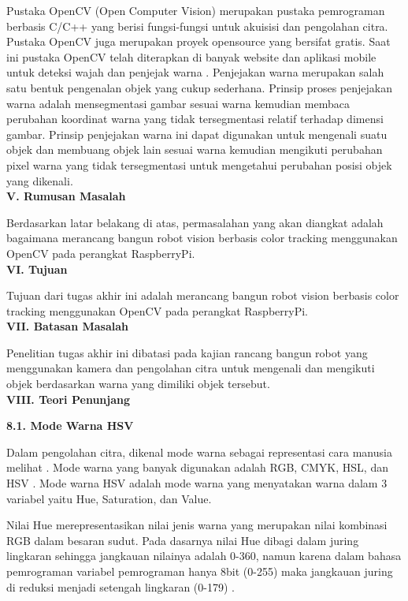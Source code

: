 \documentclass[a4paper,12pt]{article}
\begin{document}
Pustaka OpenCV (Open Computer Vision) merupakan pustaka pemrograman berbasis C/C++ yang berisi fungsi-fungsi untuk akuisisi dan pengolahan citra.
Pustaka OpenCV juga merupakan proyek opensource yang bersifat gratis.
Saat ini pustaka OpenCV telah diterapkan di banyak website dan aplikasi mobile untuk deteksi wajah dan penjejak warna \cite{opencv_intro}.
Penjejakan warna merupakan salah satu bentuk pengenalan objek yang cukup sederhana. 
Prinsip proses penjejakan warna adalah mensegmentasi gambar sesuai warna kemudian membaca perubahan koordinat warna yang tidak tersegmentasi relatif terhadap dimensi gambar.
Prinsip penjejakan warna ini dapat digunakan untuk mengenali suatu objek dan membuang objek lain sesuai warna kemudian mengikuti perubahan pixel warna yang tidak tersegmentasi untuk mengetahui perubahan posisi objek yang dikenali.
\\[10pt]
\noindent \textbf{V. \hspace{10pt} Rumusan Masalah}

Berdasarkan latar belakang di atas, permasalahan yang akan diangkat adalah bagaimana merancang bangun robot vision berbasis color tracking menggunakan OpenCV pada perangkat RaspberryPi.
\\[10pt]
\noindent \textbf{VI. \hspace{9pt} Tujuan}

Tujuan dari tugas akhir ini adalah merancang bangun robot vision berbasis color tracking menggunakan OpenCV pada perangkat RaspberryPi.
\\[10pt]
\noindent \textbf{VII. \hspace{8pt} Batasan Masalah}

Penelitian tugas akhir ini dibatasi pada kajian rancang bangun robot yang menggunakan kamera dan pengolahan citra untuk mengenali dan mengikuti objek berdasarkan warna yang dimiliki objek tersebut.
\\[10pt]
\noindent \textbf{VIII. \hspace{7pt} Teori Penunjang}

\indent \textbf{8.1. \hspace{8pt} Mode Warna HSV}

Dalam pengolahan citra, dikenal mode warna sebagai representasi cara manusia melihat \cite{robot} . 
Mode warna yang banyak digunakan adalah RGB, CMYK, HSL, dan HSV \cite{improc1}. 
Mode warna HSV adalah mode warna yang menyatakan warna dalam 3 variabel yaitu Hue, Saturation, dan Value.

Nilai Hue merepresentasikan nilai jenis warna yang merupakan nilai kombinasi RGB dalam besaran sudut. 
Pada dasarnya nilai Hue dibagi dalam juring lingkaran sehingga jangkauan nilainya adalah 0-360, namun karena dalam bahasa pemrograman variabel pemrograman hanya 8bit (0-255) maka jangkauan juring di reduksi menjadi setengah lingkaran (0-179) \cite{opencv_intro}.
\end{document}
